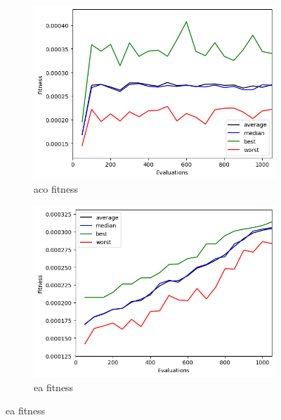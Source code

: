 \begin{figure}[H]
    \centering
    \begin{subfigure}[t]{0.5\textwidth}
        \centering
        \includegraphics[width=\linewidth]{images/lab7/tsp_base_fitness_aco.png}
        \caption{aco fitness}
    \end{subfigure}%
    \begin{subfigure}[t]{0.5\textwidth}
        \centering
        \includegraphics[width=\linewidth]{images/lab7/tsp_base_fitness_ea.png}
        \caption{ea fitness}
    \end{subfigure}
\end{figure}

